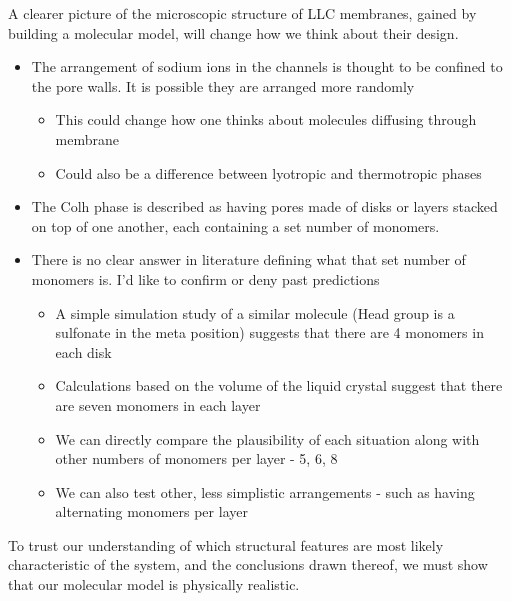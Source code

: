 \documentclass{article}
\begin{document}
	A clearer picture of the microscopic structure of LLC membranes, gained by building a molecular model, will change how we think about their design. 
	\begin{itemize}
		\item The arrangement of sodium ions in the channels is thought to be confined to the pore walls. It is possible they are arranged more randomly
		\begin{itemize}
			\item This could change how one thinks about molecules diffusing through membrane
			\item Could also be a difference between lyotropic and thermotropic phases
		\end{itemize}
		\item The Colh phase is described as having pores made of disks or layers stacked on top of one another, each containing a set number of monomers. 
		\item There is no clear answer in literature defining what that set number of monomers is. I'd like to confirm or deny past predictions
		\begin{itemize}
			\item A simple simulation study of a similar molecule (Head group is a sulfonate in the meta position) suggests that there are 4 monomers in each disk
			\item Calculations based on the volume of the liquid crystal suggest that there are seven monomers in each layer
			\item We can directly compare the plausibility of each situation along with other numbers of monomers per layer - 5, 6, 8
			\item We can also test other, less simplistic arrangements - such as having alternating monomers per layer  %
		\end{itemize}
	\end{itemize}
	
	To trust our understanding of which structural features are most likely characteristic of the system, and the conclusions drawn thereof, we must show that our molecular model is physically realistic.   
\end{document}
